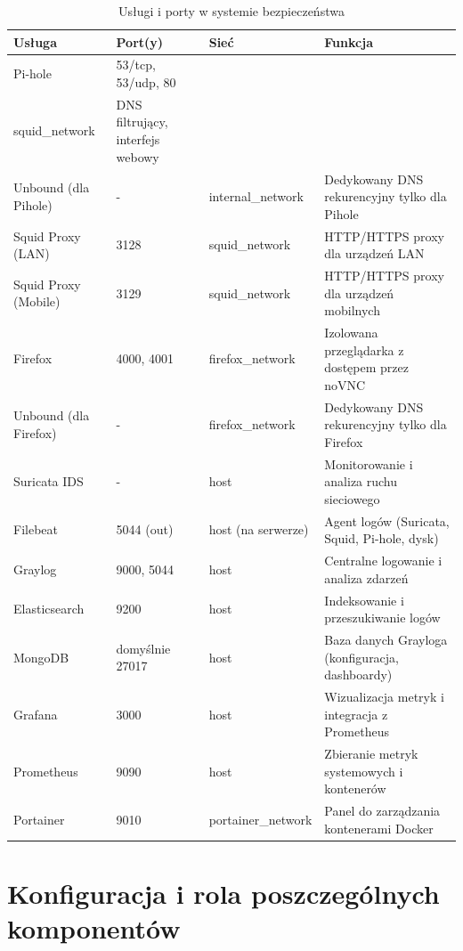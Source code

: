 \documentclass[
    left=2.5cm,         %
    right=2.5cm,        %
    top=2.5cm,          %
    bottom=3cm,         %
    bindingoffset=6mm,  %
    nohyphenation=true %
]{eiti/eiti-thesis} %
\begin{document}
\newpage
\begin{table}[H]
\centering
\caption{Usługi i porty w systemie bezpieczeństwa}
\label{tab:services-overview}
\begin{tabularx}{\textwidth}{|l|l|l|X|}
\hline
\textbf{Usługa} & \textbf{Port(y)} & \textbf{Sieć} & \textbf{Funkcja} \\
\hline
Pi-hole & 53/tcp, 53/udp, 80 & \begin{tabular}{@{}l@{}}internal\_network \\ squid\_network\end{tabular} & DNS filtrujący, interfejs webowy \\
\hline
Unbound (dla Pihole) & - & internal\_network & Dedykowany DNS rekurencyjny tylko dla Pihole \\
\hline
Squid Proxy (LAN) & 3128 & squid\_network\ & HTTP/HTTPS proxy dla urządzeń LAN \\
\hline
Squid Proxy (Mobile) & 3129 & squid\_network\ & HTTP/HTTPS proxy dla urządzeń mobilnych \\
\hline
Firefox & 4000, 4001 & firefox\_network & Izolowana przeglądarka z dostępem przez noVNC \\
\hline
Unbound (dla Firefox) & - & firefox\_network & Dedykowany DNS rekurencyjny tylko dla Firefox \\
\hline
Suricata IDS & - & host & Monitorowanie i analiza ruchu sieciowego \\
\hline
Filebeat & 5044 (out) & host (na serwerze) & Agent logów (Suricata, Squid, Pi-hole, dysk) \\
\hline
Graylog & 9000, 5044 & host & Centralne logowanie i analiza zdarzeń \\
\hline
Elasticsearch & 9200 & host & Indeksowanie i przeszukiwanie logów \\
\hline
MongoDB & domyślnie 27017 & host & Baza danych Grayloga (konfiguracja, dashboardy) \\
\hline
Grafana & 3000 & host & Wizualizacja metryk i integracja z Prometheus \\
\hline
Prometheus & 9090 & host & Zbieranie metryk systemowych i kontenerów \\
\hline
Portainer & 9010 & portainer\_network & Panel do zarządzania kontenerami Docker \\
\hline
\end{tabularx}
\end{table}


\newpage 
\section{Konfiguracja i rola poszczególnych komponentów}
\end{document}

